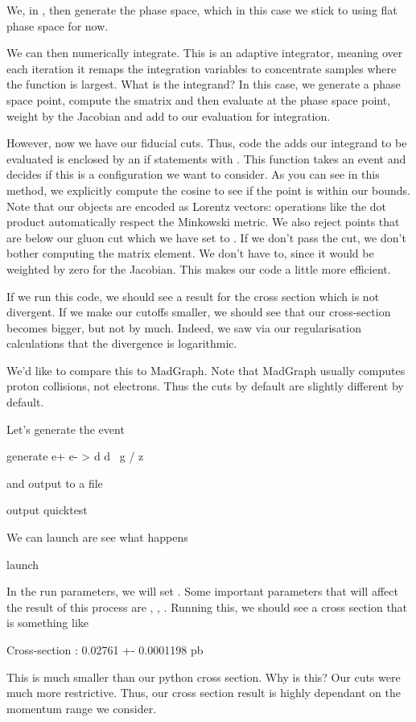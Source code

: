 We, in , then generate the phase space, which in this case we stick to using flat phase space for now.

We can then numerically integrate. This is an adaptive integrator, meaning over each iteration it remaps the integration variables to concentrate samples where the function is largest. What is the integrand? In this case, we generate a phase space point, compute the smatrix and then evaluate at the phase space point, weight by the Jacobian and add to our evaluation for integration. 

However, now we have our fiducial cuts. Thus, code the adds our integrand to be evaluated is enclosed by an if statements with . This function takes an event and decides if this is a configuration we want to consider.  As you can see in this method, we explicitly compute the cosine to see if the point is within our bounds. Note that our objects are encoded as Lorentz vectors: operations like the dot product automatically respect the Minkowski metric. We also reject points that are below our gluon cut which we have set to . If we don't pass the cut, we don't bother computing the matrix element. We don't have to, since it would be weighted by zero for the Jacobian. This makes our code a little more efficient. 

If we run this code, we should see a result for the cross section which is not divergent. If we make our cutoffs smaller, we should see that our cross-section becomes bigger, but not by much. Indeed, we saw via our regularisation calculations that the divergence is logarithmic.

We'd like to compare this to MadGraph. Note that MadGraph usually computes proton collisions, not electrons. Thus the cuts by default are slightly different by default.

Let's generate the event
\begin{codeenv}
    generate e+ e- > d d~ g / z
\end{codeenv}
and output to a file
\begin{codeenv}
   output quicktest
\end{codeenv}
We can launch are see what happens
\begin{codeenv}
    launch
\end{codeenv}
In the run parameters, we will set . Some important parameters that will affect the result of this process are , , .
Running this, we should see a cross section that is something like
\begin{codeenv}
   Cross-section :   0.02761 +- 0.0001198 pb    
\end{codeenv}
This is much smaller than our python cross section. Why is this? Our cuts were much more restrictive. Thus, our cross section result is highly dependant on the momentum range we consider.

